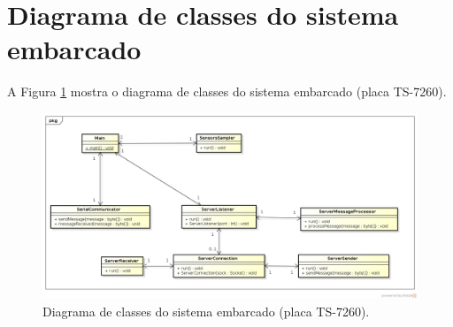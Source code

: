 % 
% 


\section{Diagrama de classes do sistema embarcado}


A Figura \ref{fig:diagrama_classes_sist_embarcado} mostra o diagrama de classes do sistema embarcado (placa TS-7260).
\begin{figure}[H]
  \centering
  \includegraphics[width=\textwidth]{./figuras/diagrama_classes_sist_embarcado.png}
  \caption{Diagrama de classes do sistema embarcado (placa TS-7260).}
  \label{fig:diagrama_classes_sist_embarcado}
\end{figure}




